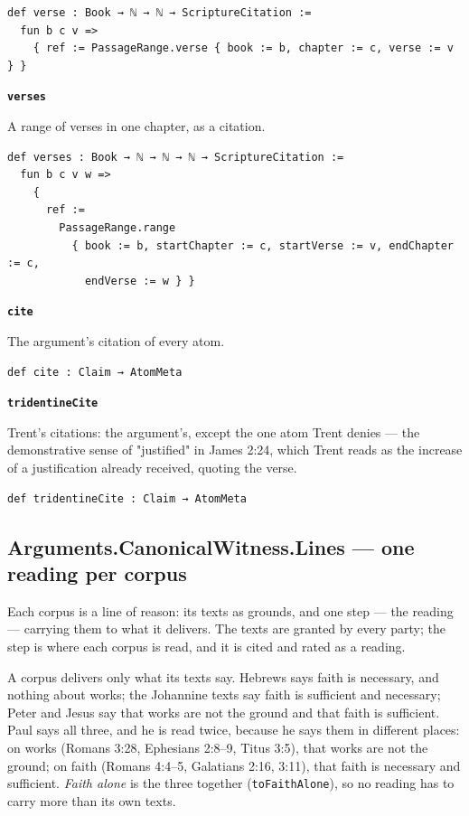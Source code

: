 \documentclass[11pt]{article}
\begin{document}
{\small\begin{verbatim}
def verse : Book → ℕ → ℕ → ScriptureCitation :=
  fun b c v =>
    { ref := PassageRange.verse { book := b, chapter := c, verse := v } }
\end{verbatim}}
\par\medskip\noindent\textbf{\texttt{verses}}\par\nobreak\noindent
A range of verses in one chapter, as a citation.

{\small\begin{verbatim}
def verses : Book → ℕ → ℕ → ℕ → ScriptureCitation :=
  fun b c v w =>
    {
      ref :=
        PassageRange.range
          { book := b, startChapter := c, startVerse := v, endChapter := c,
            endVerse := w } }
\end{verbatim}}
\par\medskip\noindent\textbf{\texttt{cite}}\par\nobreak\noindent
The argument's citation of every atom.

{\small\begin{verbatim}
def cite : Claim → AtomMeta
\end{verbatim}}
\par\medskip\noindent\textbf{\texttt{tridentine\allowbreak{}Cite}}\par\nobreak\noindent
Trent's citations: the argument's, except the one atom Trent denies — the demonstrative sense of "justified" in James 2:24, which Trent reads as the increase of a justification already received, quoting the verse.

{\small\begin{verbatim}
def tridentineCite : Claim → AtomMeta
\end{verbatim}}
\subsection*{Arguments.CanonicalWitness.Lines — one reading per corpus}
Each corpus is a line of reason: its texts as grounds, and one step — the reading — carrying them to what it delivers. The texts are granted by every party; the step is where each corpus is read, and it is cited and rated as a reading.

A corpus delivers only what its texts say. Hebrews says faith is necessary, and nothing about works; the Johannine texts say faith is sufficient and necessary; Peter and Jesus say that works are not the ground and that faith is sufficient. Paul says all three, and he is read twice, because he says them in different places: on works (Romans 3:28, Ephesians 2:8–9, Titus 3:5), that works are not the ground; on faith (Romans 4:4–5, Galatians 2:16, 3:11), that faith is necessary and sufficient. \emph{Faith alone} is the three together (\texttt{to\allowbreak{}Faith\allowbreak{}Alone}), so no reading has to carry more than its own texts.
\end{document}
